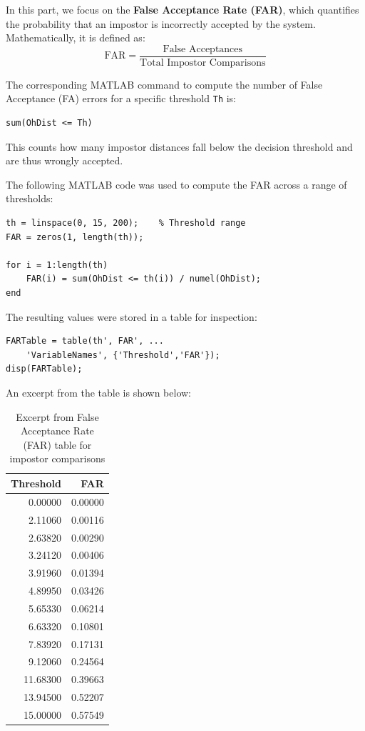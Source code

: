 \documentclass[a4paper,12pt]{article}
\begin{document}
\noindent
In this part, we focus on the \textbf{False Acceptance Rate (FAR)}, which quantifies the probability that an impostor is incorrectly accepted by the system.  
Mathematically, it is defined as:
\[
\text{FAR} = \frac{\text{False Acceptances}}{\text{Total Impostor Comparisons}}
\]

\vspace{0.5em}
\noindent
The corresponding MATLAB command to compute the number of False Acceptance (FA) errors for a specific threshold \texttt{Th} is:

\begin{verbatim}
sum(OhDist <= Th)
\end{verbatim}

\noindent
This counts how many impostor distances fall below the decision threshold and are thus wrongly accepted.

\vspace{0.5em}
\noindent
The following MATLAB code was used to compute the FAR across a range of thresholds:

\begin{verbatim}
th = linspace(0, 15, 200);    % Threshold range
FAR = zeros(1, length(th));

for i = 1:length(th)
    FAR(i) = sum(OhDist <= th(i)) / numel(OhDist);
end
\end{verbatim}

\vspace{0.5em}
\noindent
The resulting values were stored in a table for inspection:

\begin{verbatim}
FARTable = table(th', FAR', ...
    'VariableNames', {'Threshold','FAR'});
disp(FARTable);
\end{verbatim}

\vspace{1em}
\noindent
An excerpt from the table is shown below:

\begin{table}[H]
\centering
\begin{tabular}{@{}rr@{}}
\toprule
\textbf{Threshold} & \textbf{FAR} \\
\midrule
0.00000  & 0.00000 \\
2.11060  & 0.00116 \\
2.63820  & 0.00290 \\
3.24120  & 0.00406 \\
3.91960  & 0.01394 \\
4.89950  & 0.03426 \\
5.65330  & 0.06214 \\
6.63320  & 0.10801 \\
7.83920  & 0.17131 \\
9.12060  & 0.24564 \\
11.68300 & 0.39663 \\
13.94500 & 0.52207 \\
15.00000 & 0.57549 \\
\bottomrule
\end{tabular}
\caption{Excerpt from False Acceptance Rate (FAR) table for impostor comparisons}
\label{tab:far_only_table}
\end{table}
\end{document}
